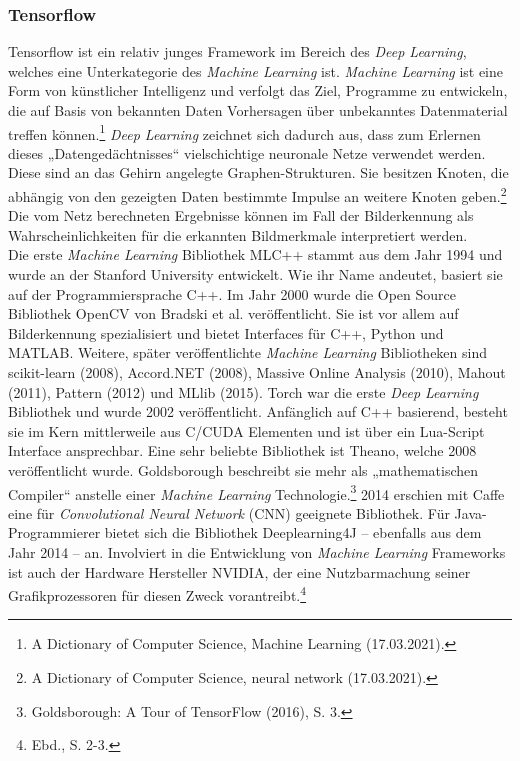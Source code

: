 \documentclass[a4paper,12pt,ngerman]{article}
\begin{document}
\subsubsection{Tensorflow}
Tensorflow ist ein relativ junges Framework im Bereich des \textit{Deep Learning}, welches eine Unterkategorie des \textit{Machine Learning} ist. \textit{Machine Learning} ist eine Form von künstlicher Intelligenz und verfolgt das Ziel, Programme zu entwickeln, die auf Basis von bekannten Daten Vorhersagen über unbekanntes Datenmaterial treffen können.\footnote{A Dictionary of Computer Science, Machine Learning (17.03.2021).}  \textit{Deep Learning} zeichnet sich dadurch aus, dass zum Erlernen dieses „Datengedächtnisses“ vielschichtige neuronale Netze verwendet werden. Diese sind an das Gehirn angelegte Graphen-Strukturen. Sie besitzen Knoten, die abhängig von den gezeigten Daten bestimmte Impulse an weitere Knoten geben.\footnote{A Dictionary of Computer Science, neural network (17.03.2021).} Die vom Netz berechneten Ergebnisse können im Fall der Bilderkennung als Wahrscheinlichkeiten für die erkannten Bildmerkmale interpretiert werden. \\
Die erste \textit{Machine Learning} Bibliothek MLC++ stammt aus dem Jahr 1994 und wurde an der Stanford University entwickelt. Wie ihr Name andeutet, basiert sie auf der Programmiersprache C++. Im Jahr 2000 wurde die Open Source Bibliothek OpenCV von Bradski et al. veröffentlicht. Sie ist vor allem auf Bilderkennung spezialisiert und bietet Interfaces für C++, Python und MATLAB. Weitere, später veröffentlichte \textit{Machine Learning} Bibliotheken sind scikit-learn (2008), Accord.NET (2008), Massive Online Analysis (2010), Mahout (2011), Pattern (2012) und MLlib (2015). Torch war die erste \textit{Deep Learning} Bibliothek und wurde 2002 veröffentlicht. Anfänglich auf C++ basierend, besteht sie im Kern mittlerweile aus C/CUDA Elementen und ist über ein Lua-Script Interface ansprechbar. Eine sehr beliebte Bibliothek ist Theano, welche 2008 veröffentlicht wurde. Goldsborough beschreibt sie mehr als „mathematischen Compiler“ anstelle einer \textit{Machine Learning} Technologie.\footnote{Goldsborough: A Tour of TensorFlow (2016), S. 3.}  2014 erschien mit Caffe eine für \textit{Convolutional Neural Network} (CNN) geeignete Bibliothek. Für Java-Programmierer bietet sich die Bibliothek Deeplearning4J -- ebenfalls aus dem Jahr 2014 -- an. Involviert in die Entwicklung von \textit{Machine Learning} Frameworks ist auch der Hardware Hersteller NVIDIA, der eine Nutzbarmachung seiner Grafikprozessoren für diesen Zweck vorantreibt.\footnote{Ebd., S. 2-3.} \\
\end{document}
